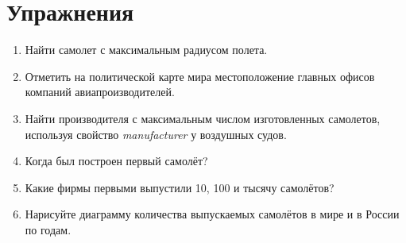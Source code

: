 






\section{Упражнения}
\begin{enumerate}
\item Найти самолет с максимальным радиусом полета.
\item Отметить на политической карте мира местоположение главных офисов компаний авиапроизводителей.
\item Найти производителя с максимальным числом изготовленных самолетов, используя свойство \textit{manufacturer} у воздушных судов.
\item Когда был построен первый самолёт?
\item Какие фирмы первыми выпустили 10, 100 и тысячу самолётов?
\item Нарисуйте диаграмму количества выпускаемых самолётов в мире и в России по годам.
\end{enumerate}
